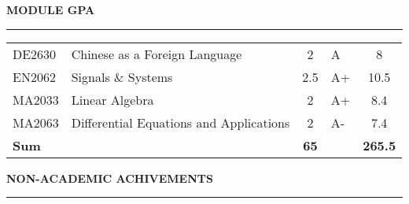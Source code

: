 \documentclass{article}
\newenvironment{rSection}[1]{
    \sectionskip
    \MakeUppercase{\bf #1} 
    \sectionlineskip
    \hrule
    \begin{list}{}{ 
        \setlength{\leftmargin}{1.5em} 
    }
    \item[]
}{
    \end{list}
}
\def\sectionskip{\medskip}
\def\sectionlineskip{\medskip}
\begin{document}
\begin{rSection}{Module GPA}
\begin{tabularx}{\linewidth}{|l|X|c|l|c|}
    DE2630  &   Chinese as a Foreign Language	            & 2     &    A  &      8    \\
    EN2062  &   Signals \& Systems	                        & 2.5   &    A+ &   10.5    \\
    MA2033  &   Linear Algebra	                            & 2     &    A+ &    8.4    \\
    MA2063  &   Differential Equations and Applications	    & 2     &    A- &    7.4    \\
    \hline
    \hline
    \bf Sum &                                               & \bf 65&       &   \bf 265.5\\
    \hline
\end{tabularx}
\end{rSection}

\newpage
\begin{rSection}{Non-Academic Achivements}


\end{rSection}
\end{document}
